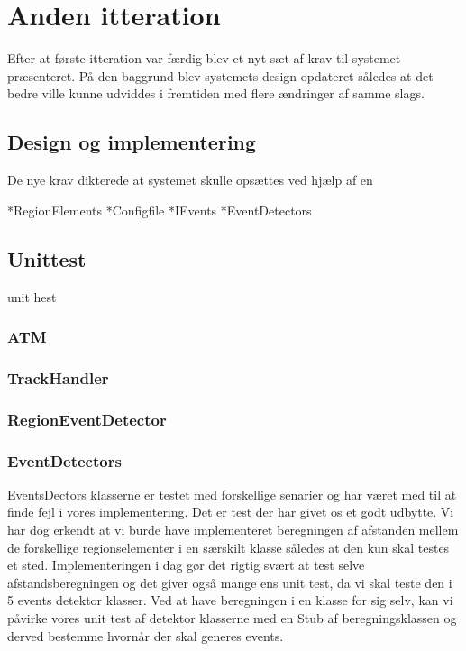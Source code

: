 \thispagestyle{fancy}
\chapter{Anden itteration}
\label{chp:seconditteration}
Efter at første itteration var færdig blev et nyt sæt af krav til systemet præsenteret. På den baggrund blev systemets design opdateret således at det bedre ville kunne udviddes i fremtiden med flere ændringer af samme slags. 

\section{Design og implementering}
De nye krav dikterede at systemet skulle opsættes ved hjælp af en 


*RegionElements
*Configfile
*IEvents
*EventDetectors


\section{Unittest}
unit hest
\subsection{ATM}
\subsection{TrackHandler}
\subsection{RegionEventDetector}
\subsection{EventDetectors}
EventsDectors klasserne er testet med forskellige senarier og har været med til at finde fejl i vores implementering. Det er test der har givet os et godt udbytte. Vi har dog erkendt at vi burde have implementeret beregningen af afstanden mellem de forskellige regionselementer i en særskilt klasse således at den kun skal testes et sted. Implementeringen i dag gør det rigtig svært at test selve afstandsberegningen og det giver også mange ens unit test, da vi skal teste den i 5 events detektor klasser. Ved at have beregningen i en klasse for sig selv, kan vi påvirke vores unit test af detektor klasserne med en Stub af beregningsklassen og derved bestemme hvornår der skal generes events.

